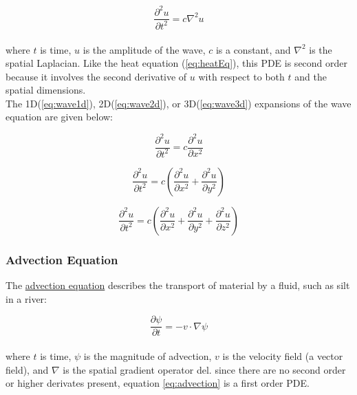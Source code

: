 { \begin{equation}\label{eq:waveEq}
 \frac{\partial^{2}u}{\partial t^{2}} = c\nabla^{2}u
   \end{equation}
     \\
 where $t$ is time, $u$ is the amplitude of the wave, $c$ is a constant, and $\nabla^{2}$ is the spatial Laplacian.  Like the heat equation (\ref{eq:heatEq}), this PDE is second order because it involves the second derivative of $u$ with respect to both $t$ and the spatial dimensions. \\
 
The 1D(\ref{eq:wave1d}), 2D(\ref{eq:wave2d}), or 3D(\ref{eq:wave3d}) expansions of the wave equation are given below:
 
 \begin{equation}\label{eq:wave1d}
  \frac{\partial^{2}u}{\partial t^{2}} = c\frac{\partial^{2}u}{\partial x^{2}}
  \end{equation}
  
   \begin{equation}\label{eq:wave2d}
  \frac{\partial^{2}u}{\partial t^{2}} = c\left(\frac{\partial^{2}u}{\partial x^{2}}+\frac{\partial^{2}u}{\partial y^{2}}\right)
  \end{equation}
  
   \begin{equation}\label{eq:wave3d}
  \frac{\partial^{2}u}{ \partial t^{2}} = c\left(\frac{\partial^{2}u}{\partial x^{2}}+\frac{\partial^{2}u}{\partial y^{2}}+\frac{\partial^{2}u}{\partial z^{2}} \right)
  \end{equation}
    
  \subsubsection{Advection Equation}
  
  The \href{https://en.wikipedia.org/wiki/Advection}{advection equation} describes the transport of material by a fluid, such as silt in a river:
  
   \begin{equation}\label{eq:advection}
  \frac{\partial \psi}{\partial t} = -v \cdot \nabla\psi
  \end{equation}
   \\
    where $t$ is time, $\psi$ is the magnitude of advection, $v$ is the velocity field (a vector field), and $\nabla$ is the spatial gradient operator del.  since there are no second order or higher derivates present, equation \ref{eq:advection} is a first order PDE.\\
    
}
